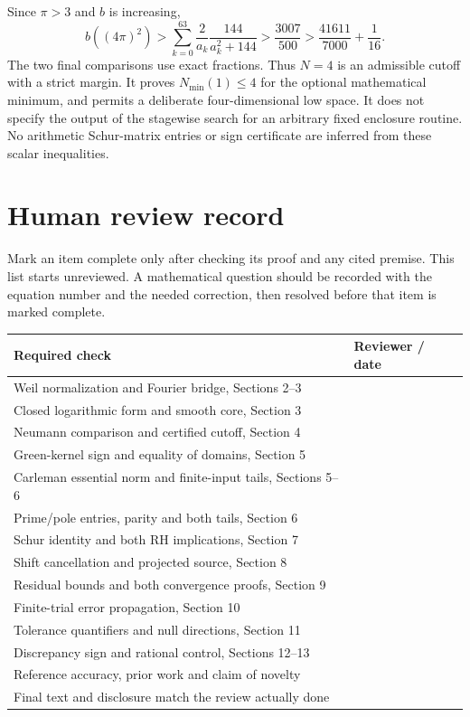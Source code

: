 Since $\pi>3$ and $b$ is increasing,
\[
b((4\pi)^2)>\sum_{k=0}^{63}\frac2{a_k}\frac{144}{a_k^2+144}
>\frac{3007}{500}>\frac{41611}{7000}+\frac1{16}.
\]
The two final comparisons use exact fractions. Thus $N=4$ is an
admissible cutoff with a strict margin. It proves $N_{\min}(1)\le4$
for the optional mathematical minimum, and permits a deliberate
four-dimensional low space. It does not specify the output of the
stagewise search for an arbitrary fixed enclosure routine.
No arithmetic Schur-matrix entries or sign certificate are inferred
from these scalar inequalities.

\clearpage
\section{Human review record}
Mark an item complete only after checking its proof and any cited premise.
This list starts unreviewed. A mathematical question should be recorded
with the equation number and the needed correction, then resolved before
that item is marked complete.
\begin{center}
\begin{tabular}{p{}p{}}
\toprule
Required check & Reviewer / date\\\midrule
Weil normalization and Fourier bridge, Sections 2--3 & \hrulefill\\[7pt]
Closed logarithmic form and smooth core, Section 3 & \hrulefill\\[7pt]
Neumann comparison and certified cutoff, Section 4 & \hrulefill\\[7pt]
Green-kernel sign and equality of domains, Section 5 & \hrulefill\\[7pt]
Carleman essential norm and finite-input tails, Sections 5--6 & \hrulefill\\[7pt]
Prime/pole entries, parity and both tails, Section 6 & \hrulefill\\[7pt]
Schur identity and both RH implications, Section 7 & \hrulefill\\[7pt]
Shift cancellation and projected source, Section 8 & \hrulefill\\[7pt]
Residual bounds and both convergence proofs, Section 9 & \hrulefill\\[7pt]
Finite-trial error propagation, Section 10 & \hrulefill\\[7pt]
Tolerance quantifiers and null directions, Section 11 & \hrulefill\\[7pt]
Discrepancy sign and rational control, Sections 12--13 & \hrulefill\\[7pt]
Reference accuracy, prior work and claim of novelty & \hrulefill\\[7pt]
Final text and disclosure match the review actually done & \hrulefill\\[7pt]
\bottomrule
\end{tabular}
\end{center}
